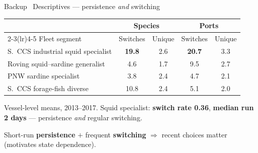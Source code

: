 \documentclass[aspectratio=169,11pt]{beamer}
\newcommand{\takeaway}[1]{\vfill\begin{takeawaybox}\small #1\end{takeawaybox}\vskip2pt}
\begin{document}
\appendix
{}

\begin{frame}{Backup \textbullet\ Descriptives --- persistence \emph{and} switching}
\small
\begin{tabular}{@{}p{} c c c c@{}}
\toprule
& \multicolumn{2}{c}{Species} & \multicolumn{2}{c}{Ports} \\
\cmidrule(lr){2-3}\cmidrule(lr){4-5}
Fleet segment & Switches & Unique & Switches & Unique \\
\midrule
S.\ CCS industrial squid specialist & \textbf{19.8} & 2.6 & \textbf{20.7} & 3.3 \\
Roving squid--sardine generalist   & 4.6  & 1.7 & 9.5  & 2.7 \\
PNW sardine specialist             & 3.8  & 2.4 & 4.7  & 2.1 \\
S.\ CCS forage-fish diverse        & 10.8 & 2.4 & 5.1  & 2.0 \\
\bottomrule
\end{tabular}
\vskip3pt
{\footnotesize Vessel-level means, 2013--2017. Squid specialist: \textbf{switch rate 0.36},
\textbf{median run 2 days} --- persistence \emph{and} regular switching.}
\takeaway{Short-run \textbf{persistence} $+$ frequent \textbf{switching} $\Rightarrow$ recent choices matter
(motivates state dependence).}
\end{frame}
\end{document}
